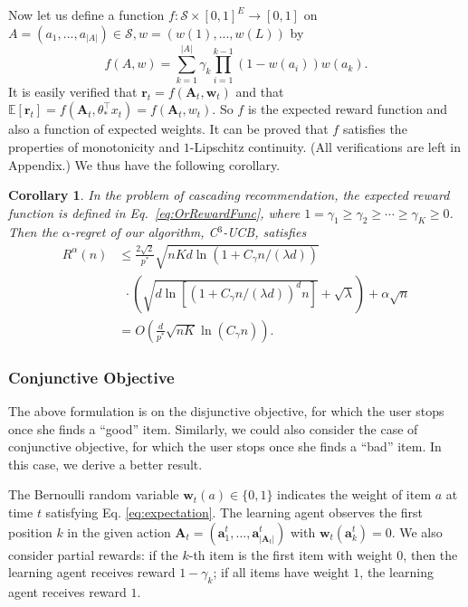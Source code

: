 \documentclass{article}
\newcommand{\EE}{\mathbb{E}}
\newcommand{\bA}{\mathbf{A}}
\newcommand{\ba}{\mathbf{a}}
\newcommand{\br}{\mathbf{r}}
\newcommand{\bw}{\mathbf{w}}
\newcommand{\cO}{\mathcal{O}}
\newcommand{\cS}{\mathcal{S}}
\newcommand{\abs}[1]{\left| #1 \right|}
\newtheorem{corollary}[theorem]{Corollary}%
\begin{document}
Now let us define a function $f: \cS \times [0,1]^E \to [0,1]$ on $A = (a_1,...,a_{\abs{A}}) \in \cS, w = (w(1),...,w(L))$ by
\begin{equation}
\label{eq:OrRewardFunc}
f(A,w) = \sum_{k = 1}^{\abs{A}} \gamma_{k} \prod_{i=1}^{k-1} (1 - w(a_i)) w(a_k). 
\end{equation}
It is easily verified that $\br_t = f(\bA_t, \bw_t)$ and that $\EE[\br_t] = f(\bA_t, \theta_{\ast}^{\top}x_t) = f(\bA_t, w_t)$. So $f$ is the expected reward function and also a function of expected weights. It can be proved that $f$ satisfies the properties of monotonicity and $1$-Lipschitz continuity. (All verifications are left in Appendix.) 
We thus have the following corollary.
\begin{corollary}
	\label{cor:or}
	In the problem of cascading recommendation, the expected reward function is defined in Eq.~\eqref{eq:OrRewardFunc}, where $1 = \gamma_1 \geq \gamma_2 \geq \cdots \geq \gamma_K \geq 0$. Then the $\alpha$-regret of our algorithm, C$^3$-UCB, satisfies
	\begin{align}
		R^{\alpha}(n) &\le \frac{2\sqrt{2}}{p^*} \sqrt{nKd\ln(1 + C_\gamma n/(\lambda d))}  \nonumber \\
		&~~ \cdot \left(\sqrt{d\ln[(1 + C_\gamma n/(\lambda d))^d n]} + \sqrt{\lambda}\right) + \alpha \sqrt{n}\nonumber \\
		&=O\left(\frac{d}{p^*} \sqrt{nK} \ln (C_\gamma n) \right).
	\end{align}
\end{corollary}

\subsubsection{Conjunctive Objective}
\label{sec:conj}

The above formulation is on the disjunctive objective, for which the user stops once she finds a ``good'' item. Similarly, we could also consider the case of conjunctive objective, for which the user stops once she finds a ``bad'' item. In this case, we derive a better result.

The Bernoulli random variable $\bw_{t}(a) \in \{0,1\}$ indicates the weight of item $a$ at time $t$ satisfying Eq. \eqref{eq:expectation}. The learning agent observes the first position $k$ in the given action $\bA_t = (\ba_1^t, \ldots, \ba_{|\bA_t|}^t)$ with $\bw_t(\ba_k^t)=0$. We also consider partial rewards: if the $k$-th item is the first item with weight $0$, then the learning agent receives reward $1-\gamma_k$; if all items have weight $1$, the learning agent receives reward $1$. 
\end{document}
